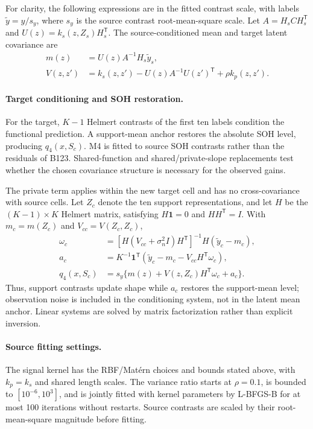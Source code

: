 \documentclass[preprint,12pt]{elsarticle}
\begin{document}
For clarity, the following expressions are in the fitted contrast scale, with labels $\widetilde y=y/s_y$, where $s_y$ is the source contrast root-mean-square scale. Let $A=H_sCH_s^{\mathsf T}$ and $U(z)=k_s(z,Z_s)H_s^{\mathsf T}$. The source-conditioned mean and target latent covariance are
\begin{align}
m(z)&=U(z)A^{-1}H_s\widetilde y_s,\\
V(z,z')&=k_s(z,z')-U(z)A^{-1}U(z')^{\mathsf T}+\rho k_p(z,z').
\end{align}
\paragraph{Target conditioning and SOH restoration.}
For the target, $K-1$ Helmert contrasts of the first ten labels condition the functional prediction. A support-mean anchor restores the absolute SOH level, producing $q_4(x,S_c)$. M4 is fitted to source SOH contrasts rather than the residuals of B123. Shared-function and shared/private-slope replacements test whether the chosen covariance structure is necessary for the observed gains.

The private term applies within the new target cell and has no cross-covariance with source cells. Let $Z_c$ denote the ten support representations, and let $H$ be the $(K-1)\times K$ Helmert matrix, satisfying $H\mathbf{1}=0$ and $HH^{\mathsf T}=I$. With $m_c=m(Z_c)$ and $V_{cc}=V(Z_c,Z_c)$,
\begin{align}
\omega_c&=[H(V_{cc}+\sigma_n^2I)H^{\mathsf T}]^{-1}H(\widetilde y_c-m_c),\\
a_c&=K^{-1}\mathbf{1}^{\mathsf T}(\widetilde y_c-m_c-V_{cc}H^{\mathsf T}\omega_c),\\
q_4(x,S_c)&=s_y\{m(z)+V(z,Z_c)H^{\mathsf T}\omega_c+a_c\}.
\end{align}
Thus, support contrasts update shape while $a_c$ restores the support-mean level; observation noise is included in the conditioning system, not in the latent mean anchor. Linear systems are solved by matrix factorization rather than explicit inversion.

\paragraph{Source fitting settings.}
The signal kernel has the RBF/Mat\'ern choices and bounds stated above, with $k_p=k_s$ and shared length scales. The variance ratio starts at $\rho=0.1$, is bounded to $[10^{-6},10^3]$, and is jointly fitted with kernel parameters by L-BFGS-B for at most 100 iterations without restarts. Source contrasts are scaled by their root-mean-square magnitude before fitting.
\end{document}
